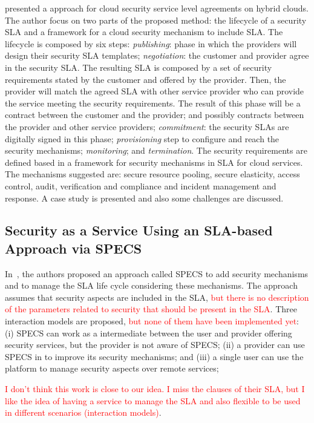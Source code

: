\documentclass[12pt,a4paper,oneside]{article}
\begin{document}
\bigskip
\cite{011} presented a approach for cloud security service level agreements on hybrid clouds. The author focus on two parts of the proposed method: the lifecycle of a security SLA and a framework for a cloud security mechanism to include SLA. The lifecycle is composed by six steps: \textit{publishing}: phase in which the providers will design their security SLA templates; \textit{negotiation}: the customer and provider agree in the security SLA. The resulting SLA is composed by a set of security requirements stated by the customer and offered by the provider. Then, the provider will match the agreed SLA with other service provider who can provide the service meeting the security requirements. The result of this phase will be a contract between the customer and the provider; and possibly contracts between the provider and other service providers; \textit{commitment}: the security SLAs are digitally signed in this phase; \textit{provisioning} step to configure and reach the security mechanisms; \textit{monitoring}; and \textit{termination}. The security requirements are defined based in a framework for security mechanisms in SLA for cloud services. The mechanisms suggested are: secure resource pooling, secure elasticity, access control, audit, verification and compliance and incident management and response. A case study is presented and also some challenges are discussed.

\subsection{Security as a Service Using an SLA-based Approach via SPECS}

In~\cite{050}, the authors proposed an approach called SPECS to add security mechanisms and to manage the SLA life cycle considering these mechanisms. The approach assumes that  security aspects are included in the SLA, \textcolor{red}{but there is no description of the parameters related to security that should be present in the SLA}. Three interaction models are proposed, \textcolor{red}{but none of them have been implemented yet}: (i) SPECS can work as a intermediate between the user and provider offering security services, but the provider is not aware of SPECS; (ii) a provider can use SPECS in to improve its security mechanisms; and (iii) a single user can use the platform to manage security aspects over remote services; 

\textcolor{red}{I don't think this work is close to our idea. I miss the clauses of their SLA, but I like the idea of having a service to manage the SLA and also flexible to be used in different scenarios (interaction models)}.
\end{document}
